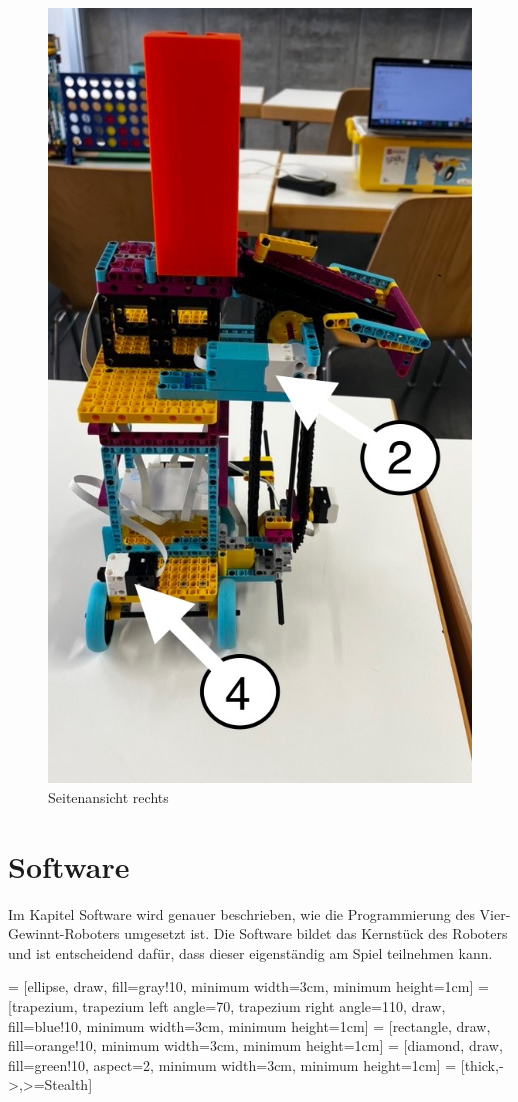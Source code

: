 \begin{figure}[H]
	\centering
	\includegraphics[width=0.5\linewidth]{images/DAE26A50-277E-4C6B-96A3-F2DE2CC9C004_1_105_c}
	\caption{Seitenansicht rechts}
	\label{fig:dae26a50-277e-4c6b-96a3-f2de2cc9c0041105c}
\end{figure}


\section{Software}
Im Kapitel Software wird genauer beschrieben, wie die Programmierung des Vier-Gewinnt-Roboters umgesetzt ist. Die Software bildet das Kernstück des Roboters und ist entscheidend dafür, dass dieser eigenständig am Spiel teilnehmen kann.



 = [ellipse, draw, fill=gray!10, minimum width=3cm, minimum height=1cm]
 = [trapezium, trapezium left angle=70, trapezium right angle=110, draw, fill=blue!10, minimum width=3cm, minimum height=1cm]
 = [rectangle, draw, fill=orange!10, minimum width=3cm, minimum height=1cm]
 = [diamond, draw, fill=green!10, aspect=2, minimum width=3cm, minimum height=1cm]
 = [thick,->,>=Stealth]

